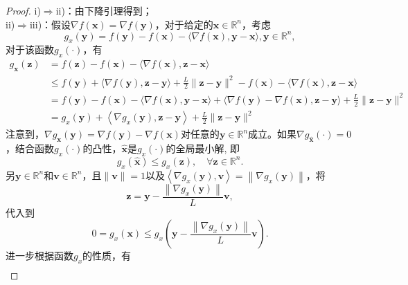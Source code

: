 \begin{proof}
    i)$  \Rightarrow  $ii)：由下降引理得到；\\
ii)$  \Rightarrow  $iii)：假设$  \nabla f(\bm{x})=\nabla f(\bm{y}) $，对于给定的$  \bm{x} \in \mathbb{R}^{n}$，考虑
\begin{equation}
g_{x}(\bm{y})=f(\bm{y})-f(\bm{x})-\langle\nabla f(\bm{x}), \bm{y}-\bm{x}\rangle, \bm{y} \in \mathbb{R}^{n},
    \nonumber
\end{equation}
对于该函数$g_{x}(\cdot)$，有
\begin{equation}
\begin{aligned}
g_{\bm{x}}(\bm{z}) &=f(\bm{z})-f(\bm{x})-\langle\nabla f(\bm{x}), \bm{z}-\bm{x}\rangle \\
& \leq f(\bm{y})+\langle\nabla f(\bm{y}), \bm{z}-\bm{y}\rangle+\frac{L}{2}\|\bm{z}-\bm{y}\|^{2}-f(\bm{x})-\langle\nabla f(\bm{x}), \bm{z}-\bm{x}\rangle \\
&=f(\bm{y})-f(\bm{x})-\langle\nabla f(\bm{x}), \bm{y}-\bm{x}\rangle+\langle\nabla f(\bm{y})-\nabla f(\bm{x}), \bm{z}-\bm{y}\rangle+\frac{L}{2}\|\bm{z}-\bm{y}\|^{2} \\
&=g_{x}(\bm{y})+\left\langle\nabla g_{x}(\bm{y}), \bm{z}-\bm{y}\right\rangle+\frac{L}{2}\|\bm{z}-\bm{y}\|^{2}
\end{aligned}
    \nonumber
\end{equation}
注意到，$\nabla g_{\bm{x}}(\bm{y})=\nabla f(\bm{y})-\nabla f(\bm{x})  $对任意的$  \bm{y} \in \mathbb{R}^{n}  $成立。如果$  \nabla g_{\hat{\bm{x}}}(\cdot)=0 $，结合函数$g_{x}(\cdot)$的凸性，$\hat{\bm{x}}  $是$g_{x}(\cdot)$的全局最小解, 即
\begin{equation}
g_{x}(\hat{\bm{x}}) \leq g_{x}(\bm{z}), \quad \forall \bm{z} \in \mathbb{R}^{n} .
    \nonumber
\end{equation}
另$  \bm{y} \in \mathbb{R}^{n}  $和$  \bm{v} \in \mathbb{R}^{n} $，且$  \|\bm{v}\|=1  $以及$  \left\langle\nabla g_{x}(\bm{y}), \bm{v}\right\rangle=\left\|\nabla g_{x}(\bm{y})\right\|$，将
\begin{equation}
    \bm{z}=\bm{y}-\frac{\left\|\nabla g_{x}(\bm{y})\right\|}{L} \bm{v},
    \nonumber
\end{equation}
代入到
\begin{equation}
0=g_{x}(\bm{x}) \leq g_{x}\left(\bm{y}-\frac{\left\|\nabla g_{x}(\bm{y})\right\|}{L} \bm{v}\right) .
    \nonumber
\end{equation}
进一步根据函数$  g_{x}  $的性质，有
\begin{equation}
\begin{aligned}

\end{aligned}
\end{equation}
\end{proof}
